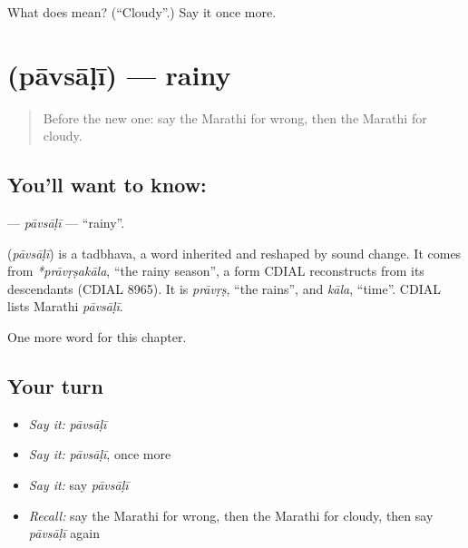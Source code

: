 \begin{tcolorbox}[breakable,colback=teal!4,colframe=teal!35!black,title={Before you move on}]
What does  mean? (\textquotedblleft{}Cloudy\textquotedblright{}.) Say it once more.
\end{tcolorbox}
\section[\texorpdfstring{\mr{पावसाळी} (pāvsāḷī)}{पावसाळी (pāvsāḷī)}]{ (pāvsāḷī) — rainy}

\label{lesson:MR-C176-pavsali}



\begin{quote}
Before the new one: say the Marathi for wrong, then the Marathi for cloudy.
\end{quote}

\subsection*{You'll want to know: }
\textbf{} — \emph{pāvsāḷī} — \textquotedblleft{}rainy\textquotedblright{}.

\begin{cousinweb}
\textbf{} (\emph{pāvsāḷī}) is a tadbhava, a word inherited and reshaped by sound change. It comes from \emph{*prāvṛṣakāla}, \textquotedblleft{}the rainy season\textquotedblright{}, a form CDIAL reconstructs from its descendants (CDIAL 8965). It is \emph{prāvṛṣ}, \textquotedblleft{}the rains\textquotedblright{}, and \emph{kāla}, \textquotedblleft{}time\textquotedblright{}. CDIAL lists Marathi \emph{pāvsāḷī}.
\end{cousinweb}

\begin{grammarlens}[title={What you've built}]
One more word for this chapter.
\end{grammarlens}

\subsection*{Your turn}
\begin{itemize}
\raggedright
  \item \emph{Say it:} \emph{pāvsāḷī}
  \item \emph{Say it:} \emph{pāvsāḷī}, once more
  \item \emph{Say it:} say \emph{pāvsāḷī}
  \item \emph{Recall:} say the Marathi for wrong, then the Marathi for cloudy, then say \emph{pāvsāḷī} again
\end{itemize}

